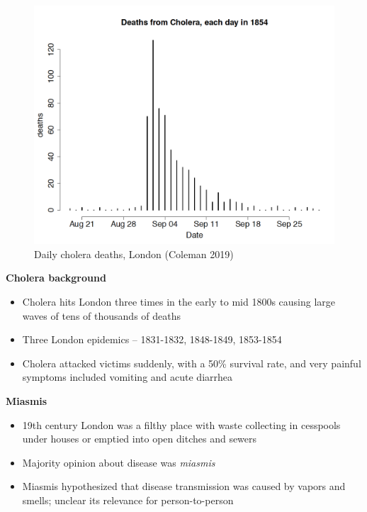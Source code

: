 \documentclass[notes=show]{beamer}
\begin{document}
\begin{frame}[plain]

\begin{figure}
\includegraphics[scale=0.2]{./lecture_includes/cholera.png}
\caption{Daily cholera deaths, London (Coleman 2019)}
\end{figure}

\end{frame}

\begin{frame}[plain]
\begin{center}
\textbf{Cholera background}
\end{center}

\begin{itemize}
\item Cholera hits London three times in the early to mid 1800s causing large waves of tens of thousands of deaths
\item Three London epidemics -- 1831-1832, 1848-1849, 1853-1854
\item Cholera attacked victims suddenly, with a 50\% survival rate, and very painful symptoms included vomiting and acute diarrhea
\end{itemize}

\end{frame}


\begin{frame}[plain]
\begin{center}
\textbf{Miasmis}
\end{center}

\begin{itemize}
\item 19th century London was a filthy place with waste collecting in cesspools under houses or emptied into open ditches and sewers
\item Majority opinion about disease was \emph{miasmis}
\item Miasmis hypothesized that disease transmission was caused by vapors and smells; unclear its relevance for person-to-person 
\end{itemize}

\end{frame}
\end{document}
